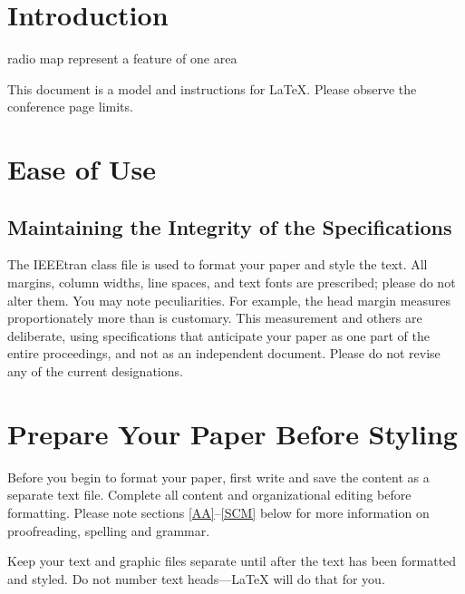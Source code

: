 \documentclass[conference]{IEEEtran}
\begin{document}
\section{Introduction}
radio map represent a feature of one area






This document is a model and instructions for \LaTeX.
Please observe the conference page limits. 

\section{Ease of Use}

\subsection{Maintaining the Integrity of the Specifications}

The IEEEtran class file is used to format your paper and style the text. All margins, 
column widths, line spaces, and text fonts are prescribed; please do not 
alter them. You may note peculiarities. For example, the head margin
measures proportionately more than is customary. This measurement 
and others are deliberate, using specifications that anticipate your paper 
as one part of the entire proceedings, and not as an independent document. 
Please do not revise any of the current designations.

\section{Prepare Your Paper Before Styling}
Before you begin to format your paper, first write and save the content as a 
separate text file. Complete all content and organizational editing before 
formatting. Please note sections \ref{AA}--\ref{SCM} below for more information on 
proofreading, spelling and grammar.

Keep your text and graphic files separate until after the text has been 
formatted and styled. Do not number text heads---{\LaTeX} will do that 
for you.
\end{document}
